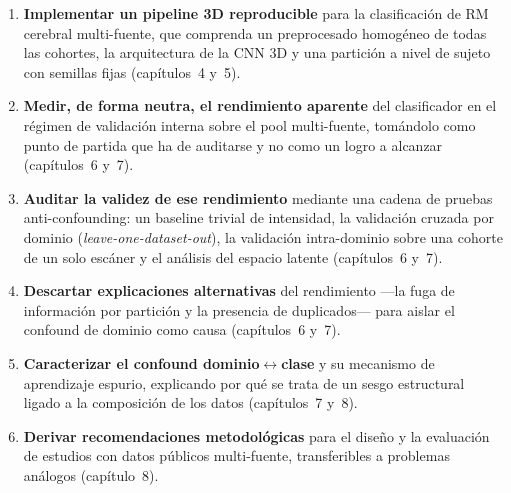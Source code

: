 \begin{enumerate}
  \item \textbf{Implementar un pipeline 3D reproducible} para la clasificación de
  RM cerebral multi-fuente, que comprenda un preprocesado homogéneo de todas las
  cohortes, la arquitectura de la CNN 3D y una partición a nivel de sujeto con
  semillas fijas (capítulos~4 y~5).

  \item \textbf{Medir, de forma neutra, el rendimiento aparente} del clasificador
  en el régimen de validación interna sobre el pool multi-fuente, tomándolo como
  punto de partida que ha de auditarse y no como un logro a alcanzar
  (capítulos~6 y~7).

  \item \textbf{Auditar la validez de ese rendimiento} mediante una cadena de
  pruebas anti-confounding: un baseline trivial de intensidad, la validación
  cruzada por dominio (\emph{leave-one-dataset-out}), la validación intra-dominio
  sobre una cohorte de un solo escáner y el análisis del espacio latente
  (capítulos~6 y~7).

  \item \textbf{Descartar explicaciones alternativas} del rendimiento ---la fuga de
  información por partición y la presencia de duplicados--- para aislar el confound
  de dominio como causa (capítulos~6 y~7).

  \item \textbf{Caracterizar el confound dominio$\leftrightarrow$clase} y su
  mecanismo de aprendizaje espurio, explicando por qué se trata de un sesgo
  estructural ligado a la composición de los datos (capítulos~7 y~8).

  \item \textbf{Derivar recomendaciones metodológicas} para el diseño y la
  evaluación de estudios con datos públicos multi-fuente, transferibles a
  problemas análogos (capítulo~8).
\end{enumerate}
